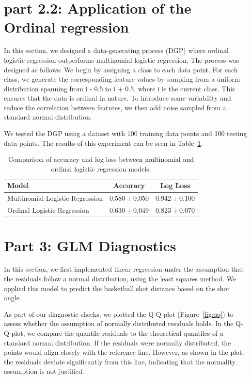 \documentclass[9pt]{IEEEtran}
\begin{document}
\section{part 2.2: Application of the Ordinal regression}
In this section, we designed a data-generating process (DGP) where ordinal
 logistic regression outperforms multinomial logistic regression. The process
  was designed as follows: We begin by assigning a class to each data point.
   For each class, we generate the corresponding feature values by sampling 
   from a uniform distribution spanning from i - 0.5 to i + 0.5, where i is 
   the current class. This ensures that the data is ordinal in nature. To 
   introduce some variability and reduce the correlation between features,
    we then add noise sampled from a standard normal distribution.

We tested the DGP using a dataset with 100 training data points and 100
 testing data points. The results of this experiment can be seen in 
 Table~\ref{tab:logistic_comparison}.


\begin{table}[ht]
    \centering
    \begin{tabular}{l|c|c}
    \textbf{Model} & \textbf{Accuracy} & \textbf{Log Loss} \\
    \hline
    Multinomial Logistic Regression & $0.580 \pm 0.050$ & $0.942 \pm 0.100$ \\
    Ordinal Logistic Regression     & $0.630 \pm 0.049$ & $0.823 \pm 0.070$ \\
 
    \end{tabular}
    \caption{Comparison of accuracy and log loss  between multinomial and ordinal logistic regression models.}
    \label{tab:logistic_comparison}
    \end{table}
    

\section{Part 3: GLM Diagnostics}
In this section, we first implemented linear regression under the
 assumption that the residuals follow a normal distribution, using the 
 least squares method. We applied this model to predict the basketball
  shot distance based on the shot angle.

As part of our diagnostic checks, we plotted the Q-Q plot
 (Figure~\ref{fig:qq}) to assess whether the assumption of normally
  distributed residuals holds. In the Q-Q plot, we compare the quantile
   residuals to the theoretical quantiles of a standard normal distribution.
    If the residuals were normally distributed, the points would align closely
     with the reference line. However, as shown in the plot, the residuals
      deviate significantly from this line, indicating that the normality 
      assumption is not justified.
\end{document}
